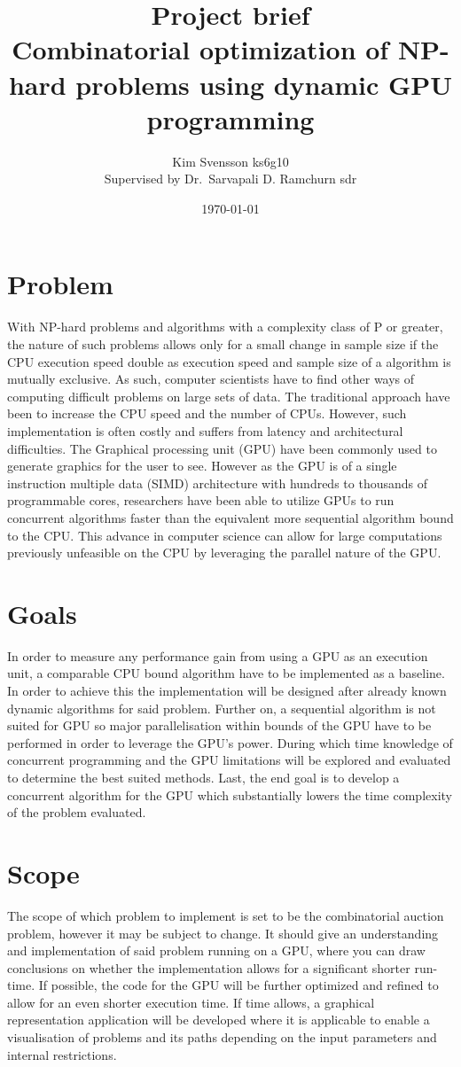 \documentclass[a4paper, 12pt]{article}
\title{Project brief \\ Combinatorial optimization of NP-hard problems using dynamic GPU programming}
\author{Kim Svensson ks6g10 \\ Supervised by Dr.\ Sarvapali D. Ramchurn sdr}
\date{\today}
\begin{document}
\maketitle
\thispagestyle{empty}
\section{Problem}
With NP-hard problems and algorithms with a complexity class of P or greater, the nature of such problems allows only for a small change in sample size if the CPU execution speed double as execution speed and sample size of a algorithm is mutually exclusive. 
As such, computer scientists have to find other ways of computing difficult problems on large sets of data. 
The traditional approach have been to increase the CPU speed and the number of CPUs. 
However, such implementation is often costly and suffers from latency and architectural difficulties. 
The Graphical processing unit (GPU) have been commonly used to generate graphics for the user to see. 
However as the GPU is of a single instruction multiple data (SIMD) architecture with hundreds to thousands of programmable cores, 
researchers have been able to utilize GPUs to run concurrent algorithms faster than the equivalent more sequential algorithm bound to the CPU. 
This advance in computer science can allow for large computations previously unfeasible on the CPU by leveraging the parallel nature of the GPU. 


\section{Goals}
In order to measure any performance gain from using a GPU as an execution unit, a comparable CPU bound algorithm have to be implemented as a baseline. 
In order to achieve this the implementation will be designed after already known dynamic algorithms for said problem.
Further on, a sequential algorithm is not suited for GPU so major parallelisation within bounds of the GPU have to be performed in order to leverage the GPU's power.
During which time knowledge of concurrent programming and the GPU limitations will be explored and evaluated to determine the best suited methods.
Last, the end goal is to develop a concurrent algorithm for the GPU which substantially lowers the time complexity of the problem evaluated.

\section{Scope}

The scope of which problem to implement is set to be the combinatorial auction problem, however it may be subject to change. 
It should give an understanding and implementation of said problem running on a GPU, where you can draw conclusions on whether the implementation allows for a significant shorter run-time. 
If possible, the code for the GPU will be further optimized and refined to allow for an even shorter execution time.
If time allows, a graphical representation application will be developed where it is applicable to enable a visualisation of problems and its paths depending on the input parameters and internal restrictions.
\end{document}
